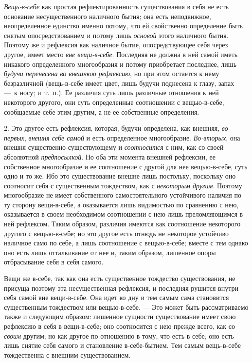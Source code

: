 {\em Вещь-в-себе} как простая рефлектированность
существования в себя не есть основание несущественного наличного бытия; она
есть неподвижное, неопределенное единство именно потому, что ей свойственно
определение быть снятым опосредствованием и потому лишь
{\em основой} этого наличного бытия. Поэтому же и
рефлексия как наличное бытие, опосредствующее себя через другое, имеет
место {\em вне вещи-в-себе}. Последняя не должна в ней
самой иметь никакого определенного многообразия и потому приобретает
последнее, лишь {\em будучи перенесена во внешнюю
рефлексию}, но при этом остается к нему безразличной (вещь-в-себе имеет
цвет, лишь будучи поднесена к глазу, запах —~к носу; и~т.~п.). Ее различия
суть лишь различные отношения к ней некоторого другого, они суть
определенные соотношении с вещью-в-себе, сообщаемые себе этим другим, а не
ее собственные определения.

2. Это другое есть рефлексия, которая, будучи определена, как внешняя,
{\em во-первых}, {\em внешня себе
самой} и есть определенное многообразие.
{\em Во-вторых}, она внешня существенно-существующему и
{\em соотносится} с ним, как со своей абсолютной
{\em предпосылкой}. Но оба эти момента внешней
рефлексии, ее собственное многообразие и ее соотношение с другой для нее
вещью-в-себе, суть одно и то же. Ибо это существование внешне лишь
постольку, поскольку оно соотносит себя с существенным тождеством, как с
{\em некоторым другим}. Поэтому многообразие не имеет
собственного самостоятельного устойчивого наличия по ту сторону
вещи-в-себе, а оказывается лишь видимостью по сравнению с нею, оказывается
в своем необходимом соотношении с нею лишь преломляющимся в ней рефлексом.
Таким образом, различия имеются как соотношение некоторого другого с
вещью-в-себе; но это другое есть отнюдь не некоторое устойчиво наличное
само по себе, а лишь соотношение с вещью-в-себе; вместе с тем однако оно
есть лишь отталкивание от нее и, таким образом, лишенное опоры отбрасывание
себя в себя самого.

Вещи же в-себе, так как она есть существенное тождество существования, не
присуща поэтому эта несущественная рефлексия, и последняя рушится внутри
себя самой вне вещи-в-себе. Она идет ко дну и тем самым сама становится
существенным тождеством или вещью-в-себе. — Это может быть рассматриваемо
также и следующим образом: лишенное сущности существование имеет свою
рефлексию в себя в вещи-в-себе; оно соотносится с нею прежде всего, как со
{\em своим} другим; но как другое по отношению в тому,
что есть в себе, оно есть лишь снятие себя самого и становление
в-себе-бытием. Тем самым вещь-в-себе тождественна с внешним существованием.


